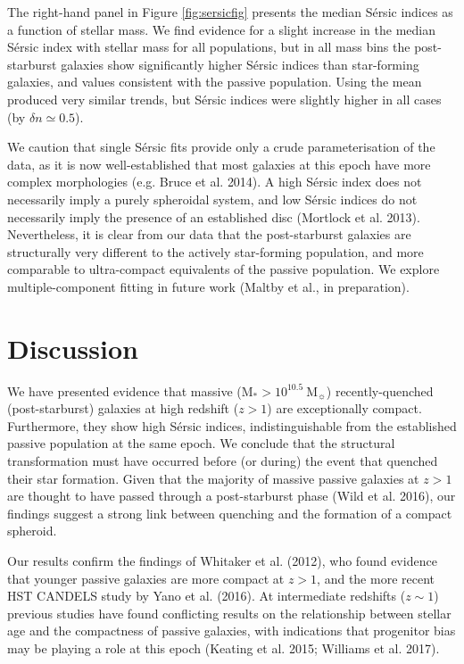 \documentclass[a4paper,fleqn,usenatbib,useAMS]{mnras}
\begin{document}
The right-hand panel in Figure \ref{fig:sersicfig} presents the median
S\'{e}rsic indices as a function of stellar mass. We find 
evidence for a slight increase in the median S\'{e}rsic index with
stellar mass for all populations, but in all mass bins the
post-starburst galaxies show significantly higher S\'{e}rsic indices
than star-forming galaxies, and values consistent 
with the passive population. Using the mean produced very
similar trends, but S\'{e}rsic indices were slightly higher in all
cases (by $\delta n\simeq 0.5$).



We caution that single S\'{e}rsic fits provide only a crude
parameterisation of the data, as it is now well-established that most
galaxies at this epoch have more complex morphologies (e.g. Bruce et
al. 2014). A high S\'{e}rsic index does not necessarily imply a purely
spheroidal system, and low S\'{e}rsic indices do not necessarily imply
the presence of an established disc (Mortlock et
al. 2013). Nevertheless, it is clear from our data that the
post-starburst galaxies are structurally very different to the
actively star-forming population, and more comparable to ultra-compact
equivalents of the passive population. We explore multiple-component
fitting in future work (Maltby et al., in preparation).







\section{Discussion}
\label{sec:discussion}



We have presented evidence that massive (M$_{\ast}> 10^{10.5}
~$M$_{\sun}$) recently-quenched (post-starburst) galaxies at high
redshift ($z>1$) are exceptionally compact.  Furthermore, they show
high S\'{e}rsic indices, indistinguishable from the established
passive population at the same epoch. We conclude that the structural
transformation must have occurred before (or during) the event that quenched
their star formation.  Given that the majority of massive passive
galaxies at $z>1$ are thought to have passed through a post-starburst
phase (Wild et al. 2016), our findings suggest a strong link between
quenching and the formation of a compact spheroid.


Our results confirm the findings of Whitaker et al. (2012), who found
evidence that younger passive galaxies are more compact at $z>1$, and
the more recent HST CANDELS study by Yano et al. (2016).  At
intermediate redshifts ($z\sim 1$) previous studies have found
conflicting results on the relationship between stellar age and the
compactness of passive galaxies, with indications that progenitor bias
may be playing a role at this epoch (Keating et al. 2015; Williams et
al. 2017).
\end{document}
